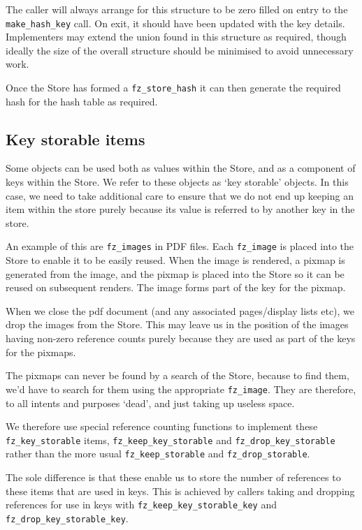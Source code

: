 \documentclass[oneside]{book}
\begin{document}
The caller will always arrange for this structure to be zero filled on entry to the \texttt{make\_hash\_key} call. On exit, it should have been updated with the key details. Implementers may extend the union found in this structure as required, though ideally the size of the overall structure should be minimised to avoid unnecessary work.

Once the Store has formed a \texttt{fz\_store\_hash} it can then generate the required hash for the hash table as required.

\subsection{Key storable items}

Some objects can be used both as values within the Store, and as a component of keys within the Store. We refer to these objects as `key storable' objects. In this case, we need to take additional care to ensure that we do not end up keeping an item within the store purely because its value is referred to by another key in the store.

An example of this are \texttt{fz\_images} in PDF files. Each \texttt{fz\_image} is placed into the Store to enable it to be easily reused. When the image is rendered, a pixmap is generated from the image, and the pixmap is placed into the Store so it can be reused on subsequent renders. The image forms part of the key for the pixmap.

When we close the pdf document (and any associated pages/display lists etc), we drop the images from the Store. This may leave us in the position of the images having non-zero reference counts purely because they are used as part of the keys for the pixmaps.

The pixmaps can never be found by a search of the Store, because to find them, we'd have to search for them using the appropriate \texttt{fz\_image}. They are therefore, to all intents and purposes `dead', and just taking up useless space.

We therefore use special reference counting functions to implement these \texttt{fz\_key\_storable} items, \texttt{fz\_keep\_key\_storable} and \texttt{fz\_drop\_key\_storable} rather than the more usual \texttt{fz\_keep\_storable} and \texttt{fz\_drop\_storable}.

The sole difference is that these enable us to store the number of references to these items that are used in keys. This is achieved by callers taking and dropping references for use in keys with \texttt{fz\_keep\_key\_storable\_key} and \texttt{fz\_drop\_key\_storable\_key}.
\end{document}
